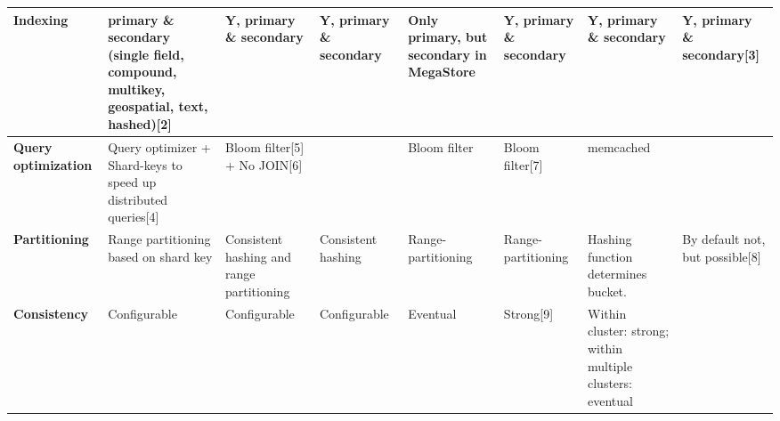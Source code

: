\documentclass{article}
\begin{document}
\begin{table}[h]
\begin{tabular}{@{}l| L{3cm}| L{3cm}| L{3cm}| L{3cm}| L{3cm}| L{3cm}| L{3cm}|@{}}
\textbf{Indexing}                   & primary \& secondary (single field, compound, multikey, geospatial, text, hashed){[}2{]}                                                                        & Y, primary \& secondary                                                                                                  & Y, primary \& secondary                       & Only primary, but secondary in MegaStore                                    & Y, primary \& secondary                                                            & Y, primary \& secondary                                                             & Y, primary \& secondary{[}3{]}      \\ \midrule
\textbf{Query optimization}         & Query optimizer + Shard-keys to speed up distributed queries{[}4{]}                                                                                             & Bloom filter{[}5{]} + No JOIN{[}6{]}                                                                                     &                                               & Bloom filter                                                                & Bloom filter{[}7{]}                                                                & memcached                                                                           &                                     \\ \midrule
\textbf{Partitioning}               & Range partitioning based on shard key                                                                                                                           & Consistent hashing and range partitioning                                                                                & Consistent hashing                            & Range-partitioning                                                          & Range-partitioning                                                                 & Hashing function determines bucket.                                                 & By default not, but possible{[}8{]} \\ \midrule
\textbf{Consistency}                & Configurable                                                                                                                                                    & Configurable                                                                                                             & Configurable                                  & Eventual                                                                    & Strong{[}9{]}                                                                      & Within cluster: strong; within multiple clusters: eventual                          &                                     \\ \midrule

\end{tabular}
\end{table}
\end{document}
